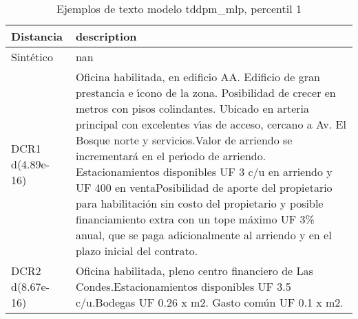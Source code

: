 \begin{table}[H]
\centering
\fontsize{10}{14}\selectfont
\caption{Ejemplos de texto modelo tddpm\_mlp, percentil 1}
\label{table-example-economicos-b-3-tddpm_mlp-1p-text}
\begin{tabular}{|l|m{35em}|}
\hline
\rowcolor[gray]{0.8}
Distancia & description \\
\hline Sintético & nan \\
\hline DCR1 d(4.89e-16) & Oficina habilitada, en edificio AA. Edificio de gran prestancia e {\'\i}cono de la zona. Posibilidad de crecer en metros con pisos colindantes. Ubicado en arteria principal con excelentes v{\'\i}as de acceso, cercano a Av. El Bosque norte y servicios.Valor de arriendo se incrementar\'a en el per{\'\i}odo de arriendo. Estacionamientos disponibles UF 3 c/u en arriendo y UF 400 en ventaPosibilidad de aporte del propietario para habilitaci\'on sin costo del propietario y posible financiamiento extra con un tope m\'aximo UF 3\% anual, que se paga adicionalmente al arriendo y en el plazo inicial del contrato. \\
\hline DCR2 d(8.67e-16) & Oficina habilitada, pleno centro financiero de Las Condes.Estacionamientos disponibles UF 3.5 c/u.Bodegas UF 0.26 x m2. Gasto com\'un UF 0.1 x m2. \\
\hline
\end{tabular}
\end{table}
